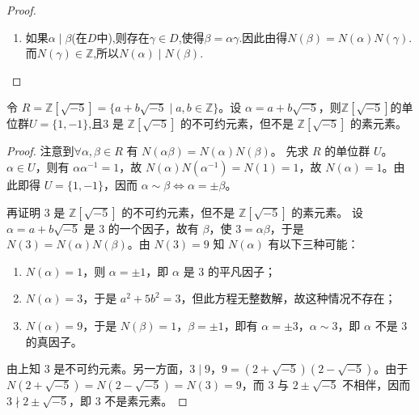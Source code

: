 \documentclass[../../main.tex]{subfiles}%
\begin{document}
\begin{proof}
\begin{enumerate}[(1)]
\item 如果$\alpha \mid \beta$(在$D$中),则存在$\gamma \in D$,使得$\beta = \alpha\gamma$.因此由得$N(\beta) = N(\alpha)N(\gamma)$.而$N(\gamma) \in \mathbb{Z}$,所以$N(\alpha) \mid N(\beta)$.
\end{enumerate}

\end{proof}

\begin{example}\label{example:不可约元素不是素元素的例子}
令 \( R = \mathbb{Z}[\sqrt{-5}] = \{a + b\sqrt{-5} \mid a, b \in \mathbb{Z}\} \)。设 \( \alpha = a + b\sqrt{-5} \)，则$\mathbb{Z}[\sqrt{-5}]$的单位群$U=\{1,-1\}$,且\( 3 \) 是 \( \mathbb{Z}[\sqrt{-5}] \) 的不可约元素，但不是 \( \mathbb{Z}[\sqrt{-5}] \) 的素元素。
\end{example}
\begin{proof}

注意到\( \forall \alpha, \beta \in R \) 有 \( N(\alpha\beta) = N(\alpha)N(\beta) \)。
先求 \( R \) 的单位群 \( U \)。\( \alpha \in U \)，则有 \( \alpha\alpha^{-1} = 1 \)，故 \( N(\alpha)N(\alpha^{-1}) = N(1) = 1 \)，故 \( N(\alpha) = 1 \)。由此即得 \( U = \{1, -1\} \)，因而 \( \alpha \sim \beta \iff \alpha = \pm\beta \)。

再证明 \( 3 \) 是 \( \mathbb{Z}[\sqrt{-5}] \) 的不可约元素，但不是 \( \mathbb{Z}[\sqrt{-5}] \) 的素元素。
设 \( \alpha = a + b\sqrt{-5} \) 是 \( 3 \) 的一个因子，故有 \( \beta \)，使 \( 3 = \alpha\beta \)，于是 \( N(3) = N(\alpha)N(\beta) \)。由 \( N(3) = 9 \) 知 \( N(\alpha) \) 有以下三种可能：
\begin{enumerate}[(1)]
\item \( N(\alpha) = 1 \)，则 \( \alpha = \pm 1 \)，即 \( \alpha \) 是 \( 3 \) 的平凡因子；
\item \( N(\alpha) = 3 \)，于是 \( a^2 + 5b^2 = 3 \)，但此方程无整数解，故这种情况不存在；
\item \( N(\alpha) = 9 \)，于是 \( N(\beta) = 1 \)，\( \beta = \pm 1 \)，即有 \( \alpha = \pm 3 \)，\( \alpha \sim 3 \)，即 \( \alpha \) 不是 \( 3 \) 的真因子。
\end{enumerate}
由上知 \( 3 \) 是不可约元素。另一方面，\( 3 \mid 9 \)，\( 9 = (2 + \sqrt{-5})(2 - \sqrt{-5}) \)。由于 \( N(2 + \sqrt{-5}) = N(2 - \sqrt{-5}) = N(3) = 9 \)，而 \( 3 \) 与 \( 2 \pm \sqrt{-5} \) 不相伴，因而 \( 3 \nmid 2 \pm \sqrt{-5} \)，即 \( 3 \) 不是素元素。
\end{proof}
\end{document}
